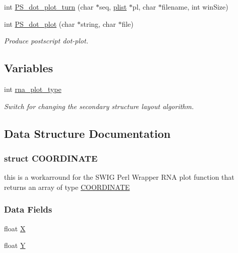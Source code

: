 \begin{DoxyCompactItemize}
\item 
int \mbox{\hyperlink{group__plotting__utils_ga5582a502d39ec3bc8d5ba3262102991c}{P\+S\+\_\+dot\+\_\+plot\+\_\+turn}} (char $\ast$seq, \mbox{\hyperlink{group__data__structures_ga9608eed021ebfbdd7a901cfdc446c8e9}{plist}} $\ast$pl, char $\ast$filename, int win\+Size)
\item 
int \mbox{\hyperlink{group__plotting__utils_ga689a97a7e3b8a2df14728b8204d9d57b}{P\+S\+\_\+dot\+\_\+plot}} (char $\ast$string, char $\ast$file)
\begin{DoxyCompactList}\small\item\em Produce postscript dot-\/plot. \end{DoxyCompactList}\end{DoxyCompactItemize}
\subsection*{Variables}
\begin{DoxyCompactItemize}
\item 
int \mbox{\hyperlink{group__plotting__utils_ga5964c4581431b098b80027d6e14dcdd4}{rna\+\_\+plot\+\_\+type}}
\begin{DoxyCompactList}\small\item\em Switch for changing the secondary structure layout algorithm. \end{DoxyCompactList}\end{DoxyCompactItemize}


\subsection{Data Structure Documentation}
\label{struct_c_o_o_r_d_i_n_a_t_e}
\subsubsection{struct C\+O\+O\+R\+D\+I\+N\+A\+TE}
this is a workarround for the S\+W\+IG Perl Wrapper R\+NA plot function that returns an array of type \mbox{\hyperlink{group__plotting__utils_struct_c_o_o_r_d_i_n_a_t_e}{C\+O\+O\+R\+D\+I\+N\+A\+TE}} \subsubsection*{Data Fields}
\begin{DoxyCompactItemize}
\item 
float \mbox{\hyperlink{group__plotting__utils_a1650ff457f1fcf1b29dfccf1cbe4c3e9}{X}}
\item 
float \mbox{\hyperlink{group__plotting__utils_a827df1c548f95486abf6c6a94d6ce6b2}{Y}}
\end{DoxyCompactItemize}


